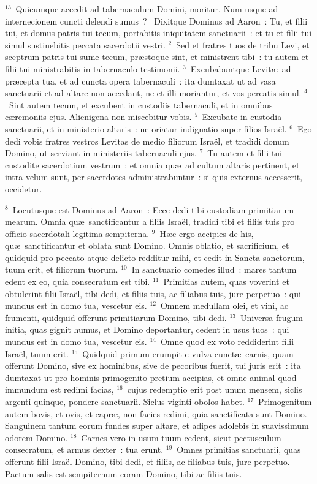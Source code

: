 ${}^{13}$~Quicumque accedit ad tabernaculum Domini, moritur. Num usque ad internecionem cuncti delendi sumus~?
~\lettrine[lines=10,image=true,loversize=0.05,lraise=-0.03]{D}{}ixitque Dominus ad Aaron~: Tu, et filii tui, et domus patris tui tecum, portabitis iniquitatem sanctuarii~: et tu et filii tui simul sustinebitis peccata sacerdotii vestri.
${}^{2}$~Sed et fratres tuos de tribu Levi, et sceptrum patris tui sume tecum, pr\ae stoque sint, et ministrent tibi~: tu autem et filii tui ministrabitis in tabernaculo testimonii.
${}^{3}$~Excubabuntque Levit\ae\ ad pr\ae cepta tua, et ad cuncta opera tabernaculi~: ita dumtaxat ut ad vasa sanctuarii et ad altare non accedant, ne et illi moriantur, et vos pereatis simul.
${}^{4}$~Sint autem tecum, et excubent in custodiis tabernaculi, et in omnibus c\ae remoniis ejus. Alienigena non miscebitur vobis.
${}^{5}$~Excubate in custodia sanctuarii, et in ministerio altaris~: ne oriatur indignatio super filios Isra\"el.
${}^{6}$~Ego dedi vobis fratres vestros Levitas de medio filiorum Isra\"el, et tradidi donum Domino, ut serviant in ministeriis tabernaculi ejus.
${}^{7}$~Tu autem et filii tui custodite sacerdotium vestrum~: et omnia qu\ae\ ad cultum altaris pertinent, et intra velum sunt, per sacerdotes administrabuntur~: si quis externus accesserit, occidetur.


${}^{8}$~Locutusque est Dominus ad Aaron~: Ecce dedi tibi custodiam primitiarum mearum. Omnia qu\ae\ sanctificantur a filiis Isra\"el, tradidi tibi et filiis tuis pro officio sacerdotali legitima sempiterna.
${}^{9}$~H\ae c ergo accipies de his, qu\ae\ sanctificantur et oblata sunt Domino. Omnis oblatio, et sacrificium, et quidquid pro peccato atque delicto redditur mihi, et cedit in Sancta sanctorum, tuum erit, et filiorum tuorum.
${}^{10}$~In sanctuario comedes illud~: mares tantum edent ex eo, quia consecratum est tibi.
${}^{11}$~Primitias autem, quas voverint et obtulerint filii Isra\"el, tibi dedi, et filiis tuis, ac filiabus tuis, jure perpetuo~: qui mundus est in domo tua, vescetur eis.
${}^{12}$~Omnem medullam olei, et vini, ac frumenti, quidquid offerunt primitiarum Domino, tibi dedi.
${}^{13}$~Universa frugum initia, quas gignit humus, et Domino deportantur, cedent in usus tuos~: qui mundus est in domo tua, vescetur eis.
${}^{14}$~Omne quod ex voto reddiderint filii Isra\"el, tuum erit.
${}^{15}$~Quidquid primum erumpit e vulva cunct\ae\ carnis, quam offerunt Domino, sive ex hominibus, sive de pecoribus fuerit, tui juris erit~: ita dumtaxat ut pro hominis primogenito pretium accipias, et omne animal quod immundum est redimi facias,
${}^{16}$~cujus redemptio erit post unum mensem, siclis argenti quinque, pondere sanctuarii. Siclus viginti obolos habet.
${}^{17}$~Primogenitum autem bovis, et ovis, et capr\ae , non facies redimi, quia sanctificata sunt Domino. Sanguinem tantum eorum fundes super altare, et adipes adolebis in suavissimum odorem Domino.
${}^{18}$~Carnes vero in usum tuum cedent, sicut pectusculum consecratum, et armus dexter~: tua erunt.
${}^{19}$~Omnes primitias sanctuarii, quas offerunt filii Isra\"el Domino, tibi dedi, et filiis, ac filiabus tuis, jure perpetuo. Pactum salis est sempiternum coram Domino, tibi ac filiis tuis.


